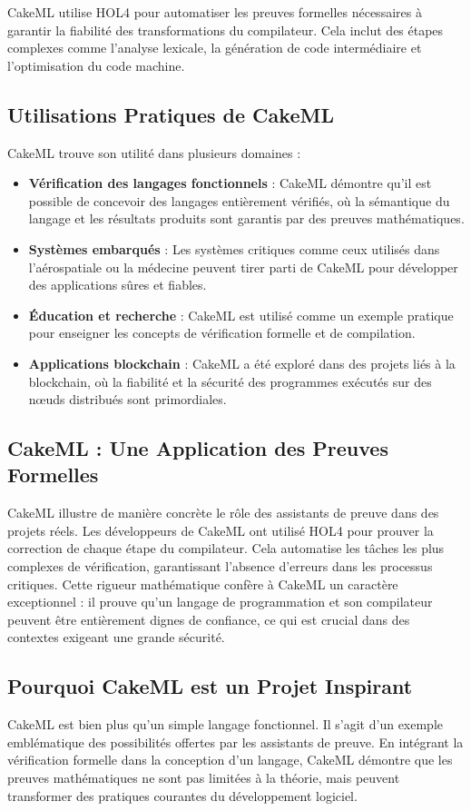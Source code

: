 CakeML utilise HOL4 pour automatiser les preuves formelles nécessaires à garantir la fiabilité des transformations du compilateur. Cela inclut des étapes complexes comme l’analyse lexicale, la génération de code intermédiaire et l’optimisation du code machine.

\subsection{Utilisations Pratiques de CakeML}
CakeML trouve son utilité dans plusieurs domaines :

\begin{itemize}
    \item \textbf{Vérification des langages fonctionnels} : CakeML démontre qu’il est possible de concevoir des langages entièrement vérifiés, où la sémantique du langage et les résultats produits sont garantis par des preuves mathématiques.
    \item \textbf{Systèmes embarqués} : Les systèmes critiques comme ceux utilisés dans l’aérospatiale ou la médecine peuvent tirer parti de CakeML pour développer des applications sûres et fiables.
    \item \textbf{Éducation et recherche} : CakeML est utilisé comme un exemple pratique pour enseigner les concepts de vérification formelle et de compilation.
    \item \textbf{Applications blockchain} : CakeML a été exploré dans des projets liés à la blockchain, où la fiabilité et la sécurité des programmes exécutés sur des nœuds distribués sont primordiales.
\end{itemize}

\subsection{CakeML : Une Application des Preuves Formelles}
CakeML illustre de manière concrète le rôle des assistants de preuve dans des projets réels. Les développeurs de CakeML ont utilisé HOL4 pour prouver la correction de chaque étape du compilateur. Cela automatise les tâches les plus complexes de vérification, garantissant l’absence d’erreurs dans les processus critiques. Cette rigueur mathématique confère à CakeML un caractère exceptionnel : il prouve qu’un langage de programmation et son compilateur peuvent être entièrement dignes de confiance, ce qui est crucial dans des contextes exigeant une grande sécurité.

\subsection{Pourquoi CakeML est un Projet Inspirant}
CakeML est bien plus qu’un simple langage fonctionnel. Il s’agit d’un exemple emblématique des possibilités offertes par les assistants de preuve. En intégrant la vérification formelle dans la conception d’un langage, CakeML démontre que les preuves mathématiques ne sont pas limitées à la théorie, mais peuvent transformer des pratiques courantes du développement logiciel.



